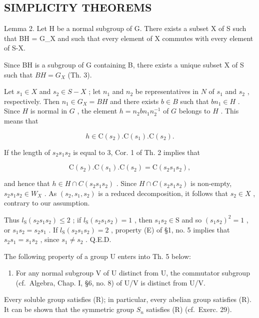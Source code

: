 \subsection{SIMPLICITY THEOREMS}

Lemma 2. Let H be a normal subgroup of G. There exists a subset X of S such that BH = G\_X and such that every element of X commutes with every element of S-X.

Since BH is a subgroup of G containing B, there exists a unique subset X of S such that \(BH = G_{X}\) (Th. 3).

Let \(s_1 \in X\) and \(s_2 \in S - X\) ; let \(n_1\) and \(n_2\) be representatives in \(N\) of \(s_1\) and \(s_2\) , respectively. Then \(n_1 \in G_X = BH\) and there exists \(b \in B\) such that \(bn_1 \in H\) . Since \(H\) is normal in \(G\) , the element \(h = n_2bn_1n_2^{-1}\) of \(G\) belongs to \(H\) . This means that

\[
h \in \mathrm{C} (s _ {2}). \mathrm{C} (s _ {1}). \mathrm{C} (s _ {2}).
\]

If the length of \(s_2s_1s_2\) is equal to 3, Cor. 1 of Th. 2 implies that

\[
\mathrm{C} (s _ {2}). \mathrm{C} (s _ {1}). \mathrm{C} (s _ {2}) = \mathrm{C} (s _ {2} s _ {1} s _ {2}),
\]

and hence that \(h \in H \cap C(s_{2}s_{1}s_{2})\) . Since \(H \cap C(s_{2}s_{1}s_{2})\) is non-empty, \(s_{2}s_{1}s_{2} \in W_{X}\) . As \((s_{2}, s_{1}, s_{2})\) is a reduced decomposition, it follows that \(s_{2} \in X\) , contrary to our assumption.

Thus \(l_{\mathrm{S}}(s_2s_1s_2) \leqslant 2\) ; if \(l_{\mathrm{S}}(s_2s_1s_2) = 1\) , then \(s_1s_2 \in \mathrm{S}\) and so \((s_1s_2)^2 = 1\) , or \(s_1s_2 = s_2s_1\) . If \(l_{\mathrm{S}}(s_2s_1s_2) = 2\) , property (E) of §1, no. 5 implies that \(s_2s_1 = s_1s_2\) , since \(s_1 \neq s_2\) . Q.E.D.

The following property of a group U enters into Th. 5 below:

\begin{enumerate}
\def\labelenumi{(\Alph{enumi})}
\setcounter{enumi}{17}
\tightlist
\item
  For any normal subgroup V of U distinct from U, the commutator subgroup (cf.~Algebra, Chap. I, §6, no. 8) of U/V is distinct from U/V.
\end{enumerate}

Every soluble group satisfies (R); in particular, every abelian group satisfies (R). It can be shown that the symmetric group \(S_{n}\) satisfies (R) (cf.~Exerc. 29).

